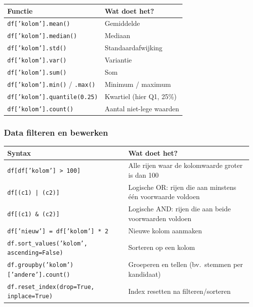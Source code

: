 \documentclass[a4paper,11pt]{article}
\begin{document}
\begin{center}
\renewcommand{\arraystretch}{1.3}
\begin{tabularx}{\linewidth}{@{}lX@{}}
\toprule
\textbf{Functie} & \textbf{Wat doet het?} \\
\midrule
\texttt{df['kolom'].mean()} & Gemiddelde \\
\texttt{df['kolom'].median()} & Mediaan \\
\texttt{df['kolom'].std()} & Standaardafwijking \\
\texttt{df['kolom'].var()} & Variantie \\
\texttt{df['kolom'].sum()} & Som \\
\texttt{df['kolom'].min()} / \texttt{.max()} & Minimum / maximum \\
\texttt{df['kolom'].quantile(0.25)} & Kwartiel (hier Q1, 25\%) \\
\texttt{df['kolom'].count()} & Aantal niet-lege waarden \\
\bottomrule
\end{tabularx}
\end{center}

\subsubsection*{Data filteren en bewerken}

\begin{center}
\renewcommand{\arraystretch}{1.3}
\begin{tabularx}{\linewidth}{@{}lX@{}}
\toprule
\textbf{Syntax} & \textbf{Wat doet het?} \\
\midrule
\texttt{df[df['kolom'] > 100]} & Alle rijen waar de kolomwaarde groter is dan 100 \\
\texttt{df[(c1) | (c2)]} & Logische OR: rijen die aan minstens één voorwaarde voldoen \\
\texttt{df[(c1) \& (c2)]} & Logische AND: rijen die aan beide voorwaarden voldoen \\
\texttt{df['nieuw'] = df['kolom'] * 2} & Nieuwe kolom aanmaken \\
\texttt{df.sort\_values('kolom', ascending=False)} & Sorteren op een kolom \\
\texttt{df.groupby('kolom')['andere'].count()} & Groeperen en tellen (bv.\ stemmen per kandidaat) \\
\texttt{df.reset\_index(drop=True, inplace=True)} & Index resetten na filteren/sorteren \\
\bottomrule
\end{tabularx}
\end{center}
\end{document}

